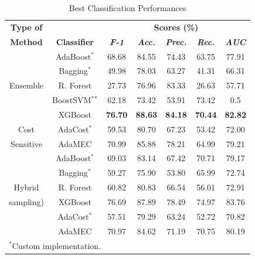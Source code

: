 \documentclass[conference]{IEEEtran}
\begin{document}
\begin{table}[htbp]
\caption{Best Classification Performances}

\begin{center}

\begin{tabular}{|c|c|c|c|c|c|c|}

\hline
\textbf{Type of} & & \multicolumn{5}{|c|}{\textbf{Scores (\%)}} \\
\cline{3-7}

\textbf{Method} & \textbf{Classifier} &\textbf{\textit{F-1}}& \textbf{\textit{Acc.}}&\textbf{\textit{Prec.}}&\textbf{\textit{Rec.}}&\textbf{\textit{AUC}}\\
\hline

& AdaBoost$^*$ &68.68&84.55&74.43&63.75&77.91  \\
\cline{2-7}

& Bagging$^*$ &49.98&78.03&63.27&41.31&66.31  \\
\cline{2-7}

Ensemble & R. Forest &27.73&76.96&83.33&26.63&57.71  \\
\cline{2-7}

& BoostSVM$^*$$^*$ &62.18&73.42&53.91&73.42&0.5  \\
\cline{2-7}

& XGBoost  &\textbf{76.70}&\textbf{88.63}&\textbf{84.18}&\textbf{70.44}&\textbf{82.82} \\
\hline

Cost & AdaCost$^*$ &59.53&80.70&67.23&53.42&72.00  \\
\cline{2-7}

Sensitive& AdaMEC &70.99&85.88&78.21&64.99&79.21  \\
\hline

& AdaBoost$^*$ &69.03&83.14&67.42&70.71&79.17  \\
\cline{2-7}

& Bagging$^*$ &59.27&75.90&53.80&65.99&72.74  \\
\cline{2-7}

Hybrid & R. Forest &60.82&80.83&66.54&56.01&72.91  \\
\cline{2-7}

sampling)& XGBoost  &76.69&87.89&78.49&74.97&83.76 \\
\cline{2-7}

 & AdaCost$^*$ &57.51&79.29&63.24&52.72&70.82  \\
\cline{2-7}

& AdaMEC &70.97&84.62&71.19&70.75&80.19  \\
\hline

\multicolumn{4}{l}{$^{\mathrm{*}}$Custom implementation.}

\multicolumn{4}{l}{$^{\mathrm{*}}$$^{\mathrm{*}}$Metrics are weighted.}

\end{tabular}

\label{tab:PerformanceComparison}
\end{center}
\end{table}
\end{document}
